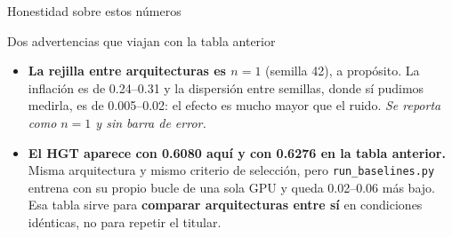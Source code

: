 \begin{frame}{Honestidad sobre estos n\'umeros}
  \begin{block}{Dos advertencias que viajan con la tabla anterior}
    \small
    \begin{itemize}
      \item<1-> \textbf{La rejilla entre arquitecturas es $n=1$} (semilla 42), a
            prop\'osito. La inflaci\'on es de 0.24--0.31 y la dispersi\'on entre semillas,
            donde s\'i pudimos medirla, es de 0.005--0.02: el efecto es mucho mayor que el
            ruido. \emph{Se reporta como $n=1$ y sin barra de error.}
      \item<2-> \textbf{El HGT aparece con 0.6080 aqu\'i y con 0.6276 en la tabla
            anterior.} Misma arquitectura y mismo criterio de selecci\'on, pero
            \texttt{run\_baselines.py} entrena con su propio bucle de una sola GPU y queda
            0.02--0.06 m\'as bajo. Esa tabla sirve para \textbf{comparar arquitecturas
            entre s\'i} en condiciones id\'enticas, no para repetir el titular.
    \end{itemize}
  \end{block}

  \vspace{0.2em}
\end{frame}

